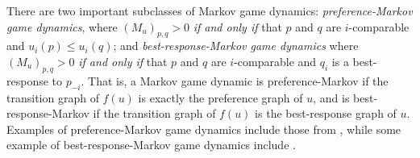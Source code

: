 \documentclass[preprint,authoryear]{elsarticle}
\begin{document}
There are two important subclasses of Markov game dynamics: \emph{preference-Markov game dynamics}, where $(M_u)_{p,q} > 0$ \emph{if and only if} that $p$ and $q$ are $i$-comparable and $u_i(p) \leq u_i(q)$; and \emph{best-response-Markov game dynamics} where $(M_u)_{p,q} > 0$ \emph{if and only if} that $p$ and $q$ are $i$-comparable and $q_i$ is a best-response to $p_{-i}$. That is, a Markov game dynamic is preference-Markov if the transition graph of $f(u)$ is exactly the preference graph of $u$, and is best-response-Markov if the transition graph of $f(u)$ is the best-response graph of $u$. Examples of preference-Markov game dynamics include those from \citep{papadimitriou_game_2019,omidshafiei_-rank_2019,hakim2024swim}, while some example of best-response-Markov game dynamics include \citep{cournot1838recherches,goemans_sink_2005,fabrikant2008complexity}.
\end{document}
